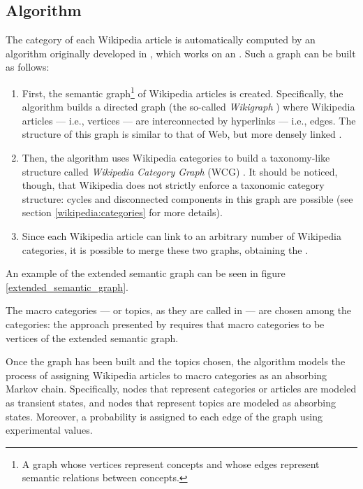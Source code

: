         \subsection{Algorithm}\label{negapedia_algorithm}
            The category of each Wikipedia article is automatically computed by an algorithm originally developed in \cite{Bonetti}, which works on an . Such a graph can be built as follows:
            \begin{enumerate}
                \item First, the semantic graph\footnote{A graph whose vertices represent concepts and whose edges represent semantic relations between concepts.} of Wikipedia articles is created. Specifically, the algorithm builds a directed graph (the so-called \emph{Wikigraph} \cite{Buriol}) where Wikipedia articles --- i.e., vertices --- are interconnected by hyperlinks --- i.e., edges. The structure of this graph is similar to that of Web, but more densely linked \cite{Kamps}.
                \item Then, the algorithm uses Wikipedia categories to build a taxonomy-like structure called \emph{Wikipedia Category Graph} (WCG) \cite{Zesch}. It should be noticed, though, that Wikipedia does not strictly enforce a taxonomic category structure: cycles and disconnected components in this graph are possible (see section \ref{wikipedia:categories} for more details).
                \item Since each Wikipedia article can link to an arbitrary number of Wikipedia categories, it is possible to merge these two graphs, obtaining the .
            \end{enumerate}
            
            An example of the extended semantic graph can be seen in figure \ref{extended_semantic_graph}.
            
            The macro categories --- or topics, as they are called in \cite{Bonetti} --- are chosen among the categories: the approach presented by \citeauthor{Bonetti} requires that macro categories to be vertices of the extended semantic graph.
            
            Once the graph has been built and the topics chosen, the algorithm models the process of assigning Wikipedia articles to macro categories as an absorbing Markov chain. Specifically, nodes that represent categories or articles are modeled as transient states, and nodes that represent topics are modeled as absorbing states. Moreover, a probability is assigned to each edge of the graph using experimental values.
            
